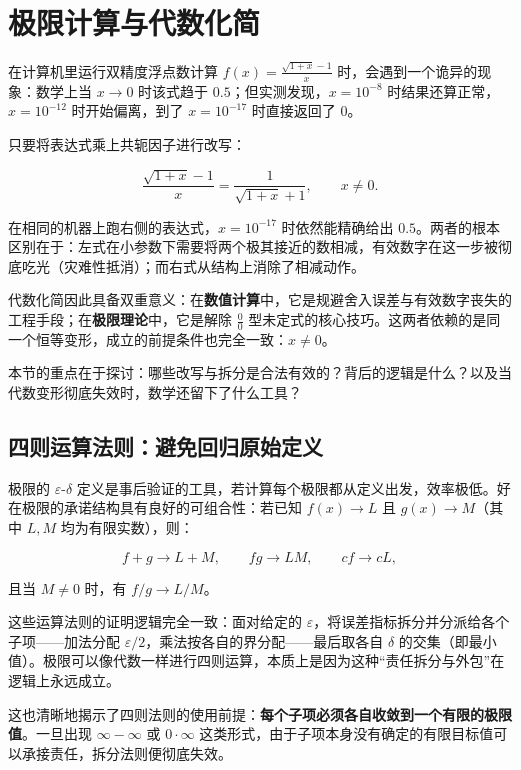 \section{极限计算与代数化简}
\label{sec:02-Calculus/02-Limits-and-Continuity/03}

在计算机里运行双精度浮点数计算 \(f(x)=\frac{\sqrt{1+x}-1}{x}\) 时，会遇到一个诡异的现象：数学上当 \(x\to0\) 时该式趋于 \(0.5\)；但实测发现，\(x=10^{-8}\) 时结果还算正常，\(x=10^{-12}\) 时开始偏离，到了 \(x=10^{-17}\) 时直接返回了 \(0\)。

只要将表达式乘上共轭因子进行改写：

\[
\frac{\sqrt{1+x}-1}{x}=\frac{1}{\sqrt{1+x}+1},\qquad x\neq0.
\]

在相同的机器上跑右侧的表达式，\(x=10^{-17}\) 时依然能精确给出 \(0.5\)。两者的根本区别在于：左式在小参数下需要将两个极其接近的数相减，有效数字在这一步被彻底吃光（灾难性抵消）；而右式从结构上消除了相减动作。

代数化简因此具备双重意义：在\textbf{数值计算}中，它是规避舍入误差与有效数字丧失的工程手段；在\textbf{极限理论}中，它是解除 \(\frac{0}{0}\) 型未定式的核心技巧。这两者依赖的是同一个恒等变形，成立的前提条件也完全一致：\(x\neq0\)。

本节的重点在于探讨：哪些改写与拆分是合法有效的？背后的逻辑是什么？以及当代数变形彻底失效时，数学还留下了什么工具？

\subsection{四则运算法则：避免回归原始定义}

极限的 \(\varepsilon\)-\(\delta\) 定义是事后验证的工具，若计算每个极限都从定义出发，效率极低。好在极限的承诺结构具有良好的可组合性：若已知 \(f(x)\to L\) 且 \(g(x)\to M\)（其中 \(L,M\) 均为有限实数），则：

\[
 f+g\to L+M,\qquad fg\to LM,\qquad cf\to cL,
\]

且当 \(M\neq0\) 时，有 \(f/g\to
 L/M\)。

这些运算法则的证明逻辑完全一致：面对给定的 \(\varepsilon\)，将误差指标拆分并分派给各个子项——加法分配 \(\varepsilon/2\)，乘法按各自的界分配——最后取各自 \(\delta\) 的交集（即最小值）。极限可以像代数一样进行四则运算，本质上是因为这种``责任拆分与外包''在逻辑上永远成立。

这也清晰地揭示了四则法则的使用前提：\textbf{每个子项必须各自收敛到一个有限的极限值}。一旦出现 \(\infty-\infty\) 或 \(0\cdot\infty\) 这类形式，由于子项本身没有确定的有限目标值可以承接责任，拆分法则便彻底失效。

